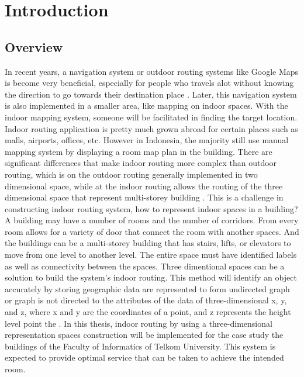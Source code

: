 \chapter{Introduction}
\section{Overview}
In recent years, a navigation system or outdoor routing systems like Google Maps is become very beneficial, especially for people who travels alot without knowing the direction to go towards their destination place \cite{gotlib2012research}. Later, this navigation system is also implemented in a smaller area, like mapping on indoor spaces. With the indoor mapping system, someone will be facilitated in finding the target location\cite{han2014design}. Indoor routing application is pretty much grown abroad for certain places such as malls, airports, offices, etc. However in Indonesia, the majority still use manual mapping system by displaying a room map plan in the building.
There are significant differences that make indoor routing more complex than outdoor routing, which is on the outdoor routing generally implemented in two dimensional space, while at the indoor routing allows the routing of the three dimensional space that represent multi-storey building \cite{han2014design}. This is a challenge in constructing indoor routing system, how to represent indoor spaces in a building? A building may have a number of rooms and the number of corridors. From every room allows for a variety of door that connect the room with another spaces. And the buildings can be a multi-storey building that has stairs, lifts, or elevators to move from one level to another level. The entire space must have identified labels as well as connectivity between the spaces. Three dimentional spaces can be a solution to build the system's indoor routing. This method will identify an object accurately by storing geographic data are represented to form undirected graph or graph is not directed to the attributes of the data of three-dimensional x, y, and z, where x and y are the coordinates of a point, and z represents the height level point the \cite{alamri2014adjacency}. 
In this thesis, indoor routing by using a three-dimensional representation spaces construction will be implemented for the case study the buildings of the Faculty of Informatics of Telkom University. This system is expected to provide optimal service that can be taken to achieve the intended room.


